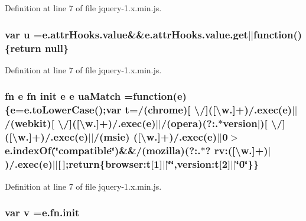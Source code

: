 Definition at line 7 of file jquery-\/1.\+x.\+min.\+js.

\subsubsection[{\texorpdfstring{u}{u}}]{\setlength{\rightskip}{0pt plus 5cm}var u ={\bf e.\+attr\+Hooks.\+value}\&\&e.\+attr\+Hooks.\+value.\+get$\vert$$\vert$function()\{return {\bf null}\}}\hypertarget{jquery-1_8x_8min_8js_accb4ce8dd4113ac0f510653e31809106}{}\label{jquery-1_8x_8min_8js_accb4ce8dd4113ac0f510653e31809106}


Definition at line 7 of file jquery-\/1.\+x.\+min.\+js.

\subsubsection[{\texorpdfstring{ua\+Match}{uaMatch}}]{ {\bf fn} {\bf e} {\bf fn} {\bf init} {\bf e} {\bf e} ua\+Match =function({\bf e})\{{\bf e}=e.\+to\+Lower\+Case();var {\bf t}=/(chrome)\mbox{[} \textbackslash{}/\mbox{]}(\mbox{[}\textbackslash{}w.\mbox{]}+)/.exec({\bf e})$\vert$$\vert$/(webkit)\mbox{[} \textbackslash{}/\mbox{]}(\mbox{[}\textbackslash{}w.\mbox{]}+)/.exec({\bf e})$\vert$$\vert$/(opera)(?\+:.$\ast${\bf version}$\vert$)\mbox{[} \textbackslash{}/\mbox{]}(\mbox{[}\textbackslash{}w.\mbox{]}+)/.exec({\bf e})$\vert$$\vert$/(msie) (\mbox{[}\textbackslash{}w.\mbox{]}+)/.exec({\bf e})$\vert$$\vert$0$>$e.\+index\+Of(\char`\"{}compatible\char`\"{})\&\&/(mozilla)(?\+:.$\ast$? rv\+:(\mbox{[}\textbackslash{}w.\mbox{]}+)$\vert$)/.exec({\bf e})$\vert$$\vert$\mbox{[}$\,$\mbox{]};return\{browser\+:t\mbox{[}1\mbox{]}$\vert$$\vert$\char`\"{}\char`\"{},version\+:t\mbox{[}2\mbox{]}$\vert$$\vert$\char`\"{}0\char`\"{}\}\}}\hypertarget{jquery-1_8x_8min_8js_a83209627bbcd8e472c524d831c48cb9b}{}\label{jquery-1_8x_8min_8js_a83209627bbcd8e472c524d831c48cb9b}


Definition at line 7 of file jquery-\/1.\+x.\+min.\+js.

\subsubsection[{\texorpdfstring{v}{v}}]{\setlength{\rightskip}{0pt plus 5cm}var v ={\bf e.\+fn.\+init}}\hypertarget{jquery-1_8x_8min_8js_afc3dd12de12777f6e20b4c93b7e7cb96}{}\label{jquery-1_8x_8min_8js_afc3dd12de12777f6e20b4c93b7e7cb96}


